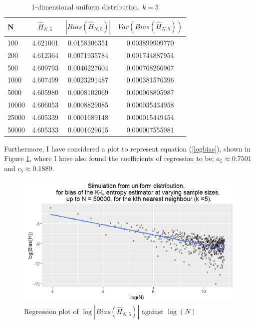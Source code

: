 \documentclass{article}
\begin{document}
\begin{table}
\caption{1-dimensional uniform distribution, $k=5$} \label{uniform_k=5_table}
\begin{center}
\begin{tabular}{| l | c c c|} 
\toprule
N & $\hat{H}_{N, 5}$ & $|Bias(\hat{H}_{N, 5})|$ & $Var(Bias(\hat{H}_{N, 5}))$ \\
\midrule[1pt]
100     & 4.621001     & 0.0158306351     & 0.003899909770  \\
200     & 4.612364     & 0.0071935784     & 0.001744887954  \\
500     & 4.609793     & 0.0046227604     & 0.000768266967  \\
1000    & 4.607499     & 0.0023291487     & 0.000381576396  \\
5000    & 4.605980     & 0.0008102069     & 0.000068805987  \\
10000   & 4.606053     & 0.0008829085     & 0.000035434958  \\
25000   & 4.605339     & 0.0001689148     & 0.000015449454  \\
50000   & 4.605333     & 0.0001629615     & 0.000007555981  \\
\hline
\end{tabular}
\end{center}
\end{table}

Furthermore, I have considered a plot to represent equation (\ref{logbias}), shown in Figure \ref{uniform_k=5_graph}, where I have also found the coefficients of regression to be; $a_{5} \approx 0.7501$ and $c_{5} \approx 0.1889$. 

\begin{figure}
  \begin{center}
    \includegraphics[width=\textwidth]{./Graphs/Uniform_k=5_plot.png}
  \end{center}
\caption{Regression plot of $\log|Bias(\hat{H}_{N, 5})|$ against $\log(N)$}
  \label{uniform_k=5_graph}
\end{figure}
\end{document}
